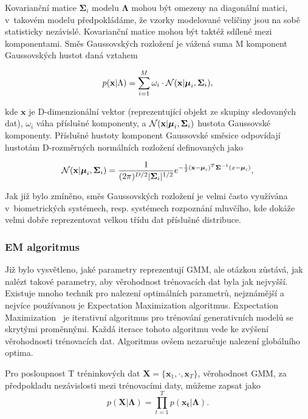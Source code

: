 Kovarianční matice $\mathbf{\Sigma}_{i}$ modelu $\mathbf{\Lambda}$ mohou být omezeny na diagonální matici, v~takovém modelu předpokládáme, že vzorky modelované veličiny jsou na sobě statisticky nezávislé. Kovarianční matice mohou být taktéž sdílené mezi komponentami. Směs Gaussovských rozložení je vážená suma M komponent Gaussovských hustot daná vztahem

\begin{equation}
    \label{eqn:GMM}
    p(\mathbf{x}|\Lambda) = \sum_{i=1}^{M} \omega_i \cdot \mathcal{N}(\mathbf{x}|\text{\boldmath$\mu$}_{i},\mathbf{\Sigma}_{i}),
\end{equation}

kde $\mathbf{x}$ je D-dimenzionální vektor (reprezentující objekt ze skupiny sledovaných dat), $\omega_i$ váha příslušné komponenty, a $\mathcal{N}(\mathbf{x}|\text{\boldmath$\mu$}_{i},\mathbf{\Sigma}_{i})$ hustota Gaussovské komponenty. Příslušné hustoty komponent Gaussovské směsice odpovídají hustotám D-rozměrných normálních rozložení definovaných jako

\begin{equation}
    \label{eqn:Normal_distribution}
    \mathcal{N}(\mathbf{x}|\text{\boldmath$\mu$}_{i},\mathbf{\Sigma}_{i}) = \frac{1}{(2\pi)^{D/2}|\mathbf{\Sigma}_i|^{1/2}} e^{-\frac{1}{2}(\mathbf{x} - \text{\boldmath$\mu$}_{i})^T \mathbf{\Sigma}^{-1} (x - \text{\boldmath$\mu$}_{i})},
\end{equation}

Jak již bylo zmíněno, směs Gaussovských rozložení je velmi často využívána v~biometrických systémech, resp. systémech rozpoznání mluvčího, kde dokáže velmi dobře reprezentovat velkou třídu dat příslušné distribuce.  
\subsubsection{EM algoritmus}
Již bylo vysvětleno, jaké parametry reprezentují GMM, ale otázkou zůstává, jak nalézt takové parametry, aby věrohodnost trénovacích dat byla jak nejvyšší. Existuje mnoho technik pro nalezení optimálních parametrů, nejznámější a nejvíce používanou je Expectation Maximization algoritmus. Expectation Maximization~\cite{Dempster77maximumlikelihood} je iterativní algoritmus pro trénování generativních modelů se skrytými proměnnými. Každá iterace tohoto algoritmu vede ke zvýšení věrohodnosti trénovacích
dat. Algoritmus ovšem nezaručuje nalezení globálního optima.

Pro posloupnost T tréninkových dat $\mathbf{X} = \{\mathbf{x}_{1}, \cdot, \mathbf{x}_{T}\}$, věrohodnost GMM, za předpokladu nezávislosti mezi trénovacími daty, můžeme zapsat jako
\begin{equation}
    \label{eqn:GMM_likelihood}
    p(\mathbf{X}|\mathbf{\Lambda}) = \prod_{t=1}^{T} p(\mathbf{x_t}|\mathbf{\Lambda}).
\end{equation}


